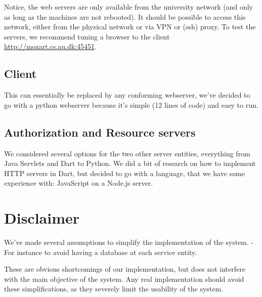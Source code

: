 \documentclass[12pt, a4paper]{article}
\begin{document}
  Notice, the web servers are only available from the university network
  (and only as long as the machines are not rebooted).
  It should be possible to access this network, either from the physical
  network or via VPN or (ssh) proxy.
  To test the servers, we recommend tuning a browser to the client
  \url{http://mozart.cs.au.dk:45451}.


  \subsection*{Client}
  This can essentially be replaced by any conforming webserver, we've
  decided to go with a python webserver because it's simple (12 lines of
  code) and easy to run.

  \subsection*{Authorization and Resource servers}

  We considered several options for the two other server entities,
  everything from Java Servlets and Dart to Python.
  We did a bit of research on how to implement HTTP servers in Dart, but
  decided to go with a language, that we have some experience with:
  JavaScript on a Node.js server.

\section*{Disclaimer}
  We've made several assumptions to simplify the implementation of the
  system.
  - For instance to avoid having a database at each service entity.

  These are obvious shortcomings of our implementation, but does not
  interfere with the main objective of the system.
  Any real implementation should avoid these simplifications, as they
  severely limit the usability of the system.
\end{document}
